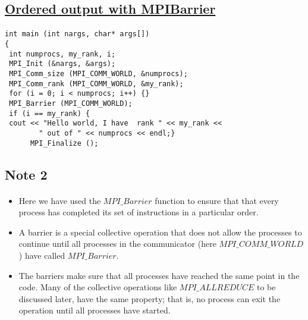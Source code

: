 \subsection*{\href{{https://github.com/CompPhysics/ComputationalPhysics2/blob/gh-pages/doc/Programs/LecturePrograms/programs/MPI/chapter07/program3.cpp}}{Ordered output with MPIBarrier}}

\paragraph{}














\begin{verbatim}
int main (int nargs, char* args[])
{
 int numprocs, my_rank, i;
 MPI_Init (&nargs, &args);
 MPI_Comm_size (MPI_COMM_WORLD, &numprocs);
 MPI_Comm_rank (MPI_COMM_WORLD, &my_rank);
 for (i = 0; i < numprocs; i++) {}
 MPI_Barrier (MPI_COMM_WORLD);
 if (i == my_rank) {
 cout << "Hello world, I have  rank " << my_rank << 
        " out of " << numprocs << endl;}
      MPI_Finalize ();

\end{verbatim}



\subsection*{Note 2}

\paragraph{}
\begin{itemize}
\item Here we have used the $MPI\_Barrier$ function to ensure that that every process has completed  its set of instructions in  a particular order.

\item A barrier is a special collective operation that does not allow the processes to continue until all processes in the communicator (here $MPI\_COMM\_WORLD$) have called $MPI\_Barrier$. 

\item The barriers make sure that all processes have reached the same point in the code. Many of the collective operations like $MPI\_ALLREDUCE$ to be discussed later, have the same property; that is, no process can exit the operation until all processes have started. 
\end{itemize}

